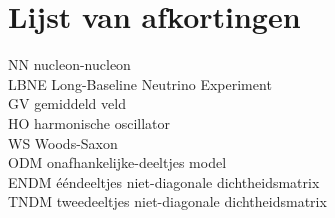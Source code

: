 \documentclass[11pt,twoside]{book}
\begin{document}
\chapter{Lijst van afkortingen}

NN nucleon-nucleon \\
LBNE Long-Baseline Neutrino Experiment \\
GV gemiddeld veld \\
HO harmonische oscillator \\
WS Woods-Saxon \\
ODM onafhankelijke-deeltjes model \\
ENDM \'{e}\'{e}ndeeltjes niet-diagonale dichtheidsmatrix \\
TNDM tweedeeltjes niet-diagonale dichtheidsmatrix \\




\newpage




\listoffigures
\listoftables
\end{document}
